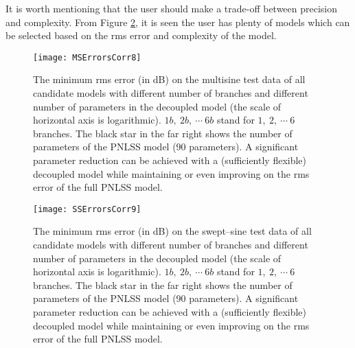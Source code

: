 \documentclass[review]{elsarticle}
\begin{document}
It is worth mentioning that the user should make a trade-off between precision and complexity. From Figure \ref{fig:RMS4}, it is seen the user has plenty of models which can be selected based on the rms error and complexity of the model.

\begin{figure}[ht]
\begin{center}
\texttt{[image: MSErrorsCorr8]}    %
\caption{The minimum rms error (in dB) on the multisine test data of all candidate models with different number of branches and different number of parameters in the decoupled model (the scale of horizontal axis is logarithmic). $1b,\ 2b, \ \cdots \ 6b$ stand for $1, \ 2, \ \cdots \ 6$ branches. The black star in the far right shows the number of parameters of the  PNLSS model (90 parameters).
A significant parameter reduction can be achieved with a (sufficiently flexible) decoupled model while maintaining or even improving on the rms error of the full PNLSS model.}
\label{fig:RMS3}
\end{center}
\end{figure}

\begin{figure}[ht]
\begin{center}
\texttt{[image: SSErrorsCorr9]}    %
\caption{The minimum rms error (in dB) on the swept--sine test data of all candidate models with different number of branches and different number of parameters in the decoupled model (the scale of horizontal axis is logarithmic). $1b,\ 2b, \ \cdots \ 6b$ stand for $1, \ 2, \ \cdots \ 6$ branches. The black star in the far right shows the number of parameters of the  PNLSS model (90 parameters).
A significant parameter reduction can be achieved with a (sufficiently flexible) decoupled model while maintaining or even improving on the rms error of the full PNLSS model.} 
\label{fig:RMS4}
\end{center}
\end{figure}
\end{document}
